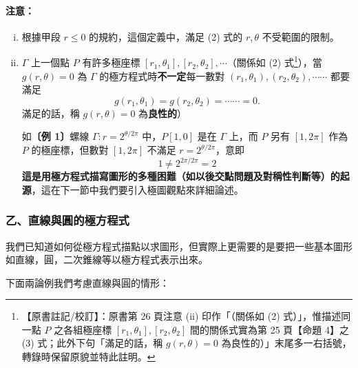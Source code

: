 \paragraph{注意：}
\begin{enumerate}[(i)]
  \item 根據甲段 $r \le 0$ 的規約，這個定義中，滿足 (2) 式的 $r, \theta$ 不受範圍的限制。
  \item $\Gamma$ 上一個點 $P$ 有許多極座標 $[r_1, \theta_1], [r_2, \theta_2], \cdots$（關係如 (2) 式\label{note:b5s-ch1-p26-note}\footnote{【原書註記/校訂】：原書第 26 頁注意 (ii) 印作「（關係如 (2) 式）」，惟描述同一點 $P$ 之各組極座標 $[r_1, \theta_1], [r_2, \theta_2]$ 間的關係式實為第 25 頁【命題 4】之 (3) 式；此外下句「滿足的話，稱 $g(r, \theta) = 0$ 為良性的）」末尾多一右括號，轉錄時保留原貌並特此註明。}），當 $g(r, \theta) = 0$ 為 $\Gamma$ 的極方程式時\textbf{不一定}每一數對 $(r_1, \theta_1), (r_2, \theta_2), \cdots\cdots$ 都要滿足
  \[
    g(r_1, \theta_1) = g(r_2, \theta_2) = \cdots\cdots = 0.
  \]
  滿足的話，稱 $g(r, \theta) = 0$ 為\textbf{良性的}）

  如\textbf{〔例 1〕}螺線 $\Gamma : r = 2^{\theta/2\pi}$ 中，$P[1, 0]$ 是在 $\Gamma$ 上，而 $P$ 另有 $[1, 2\pi]$ 作為 $P$ 的極座標，但數對 $[1, 2\pi]$ 不滿足 $r = 2^{\theta/2\pi}$，意即
  \[
    1 \neq 2^{2\pi/2\pi} = 2
  \]
  \textbf{這是用極方程式描寫圖形的多種困難（如以後交點問題及對稱性判斷等）的起源}，這在下一節中我們要引入極圖觀點來詳細論述。
\end{enumerate}

\subsubsection*{乙、直線與圓的極方程式}\label{subsec:b5s-1-3-b}

我們已知道如何從極方程式描點以求圖形，但實際上更需要的是要把一些基本圖形如直線，圓，二次錐線等以極方程式表示出來。

下面兩論例我們考慮直線與圓的情形：

